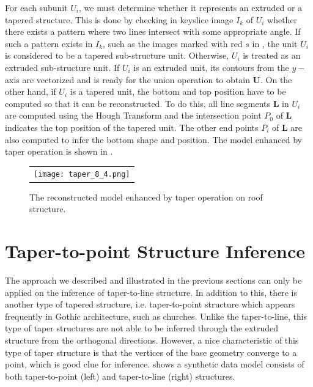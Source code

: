 For each subunit $U_i$, we must determine 
whether it represents an extruded or a tapered structure.
This is done by checking in keyslice image $I_k$ of $U_i$ whether there exists
a pattern where two lines intersect with some appropriate angle.
If such a pattern exists in $I_k$, such as the images marked with red $s$ in
, the unit $U_i$ is considered to be a tapered sub-structure unit.
Otherwise, $U_i$ is treated as an extruded sub-structure unit.
If $U_i$ is an extruded unit, its contours from the $y-$ axis are vectorized
and is ready for the union operation to obtain $\boldsymbol{U}$.
On the other hand, if $U_i$ is a tapered unit, the bottom and top position
have to be computed so that it can be reconstructed.
To do this, all line segments $\boldsymbol{L}$ in $U_i$ are computed using
the Hough Transform and the intersection point $P_0$ of $\boldsymbol{L}$
indicates the top position of the tapered unit.
The other end points $P_i$ of $\boldsymbol{L}$ are also computed to infer
the bottom shape and position. 
The model enhanced by taper operation is shown in .

\begin{figure}[htbp]
\begin{center}
\begin{tabular}{c}
\texttt{[image: taper\_8\_4.png]}
\end{tabular}
\end{center}
\caption{ The reconstructed model enhanced by taper operation on roof structure. }
\label{fig:DXF_taper_model}
\end{figure}

\section{Taper-to-point Structure Inference}
\label{sec:tsd_ttp}
The approach we described and illustrated in the previous sections can only be
applied on the inference of taper-to-line structure. 
In addition to this, there is another
type of tapered structure, i.e. taper-to-point structure which appears frequently in 
Gothic architecture, such as churches.
Unlike the taper-to-line, this type of taper structures are not able to be inferred 
through the extruded structure from the orthogonal directions.
However, a nice characteristic of this type of taper structure is that
the vertices of the base geometry converge to a point, which is good clue for inference.
 shows a synthetic data model consists of both taper-to-point (left)
and taper-to-line (right) structures. 

